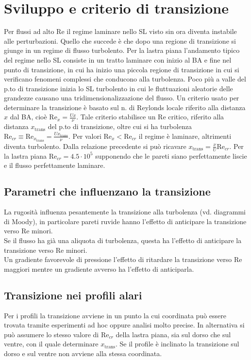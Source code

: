 \documentclass[11pt,a4paper]{report}
\begin{document}
	\section{Sviluppo e criterio di transizione}
	Per flussi ad alto Re il regime laminare nello SL visto sin ora diventa instabile alle perturbazioni. Quello che succede è che dopo una regione di transizione si giunge in un regime di flusso turbolento. Per la lastra piana l'andamento tipico del regime nello SL consiste in un tratto laminare con inizio al BA e fine nel punto di transizione, in cui ha inizio una piccola regione di transizione in cui si verificano fenomeni complessi che conducono alla turbolenza. Poco più a valle del p.to di transizione inizia lo SL turbolento in cui le fluttuazioni aleatorie delle grandezze causano una tridimensionalizzazione del flusso. Un criterio usato per determinare la transizione è basato sul n. di Reylonds locale riferito alla distanza $x$ dal BA, cioè $\mathrm{Re}_x=\frac{Ux}{\nu}$. Tale criterio stabilisce un Re critico, riferito alla distanza $x_\mathrm{trans}$ del p.to di transizione, oltre cui si ha turbolenza $\mathrm{Re}_{cr}\equiv\mathrm{Re}_{x_\mathrm{trans}}=\frac{Ux_\mathrm{trans}}\nu$. Per valori $\mathrm{Re}_x<\mathrm{Re}_{cr}$ il regime è laminare, altrimenti diventa turbolento. Dalla relazione precedente si può ricavare $x_\mathrm{trans}=\frac{\nu}{U}\mathrm{Re}_{cr}$. Per la lastra piana $\mathrm{Re}_{cr}=4.5\cdot 10^5$ supponendo che le pareti siano perfettamente liscie e il flusso perfettamente laminare.
		\subsection{Parametri che influenzano la transizione}
		La rugosità influenza pesantemente la transizione alla turbolenza (vd. diagrammi di Moody), in particolare pareti ruvide hanno l'effetto di anticipare la transizione verso Re minori.\\
		Se il flusso ha già una aliquota di turbolenza, questa ha l'effetto di anticipare la transizione verso Re minori.\\
		Un gradiente favorevole di pressione l'effetto di ritardare la transizione verso Re maggiori mentre un gradiente avverso ha l'effetto di anticiparla.
		\subsection{Transizione nei profili alari}
		Per i profili la transizione avviene in un punto la cui coordinata può essere trovata tramite esperimenti ad hoc oppure analisi molto precise. In alternativa si può assumere lo stesso valore di $\mathrm{Re}_{cr}$ della lastra piana, sia sul dorso che sul ventre, con il quale determinare $x_\mathrm{trans}$. Se il profile è inclinato la transizione sul dorso e sul ventre non avviene alla stessa coordinata.
\end{document}
